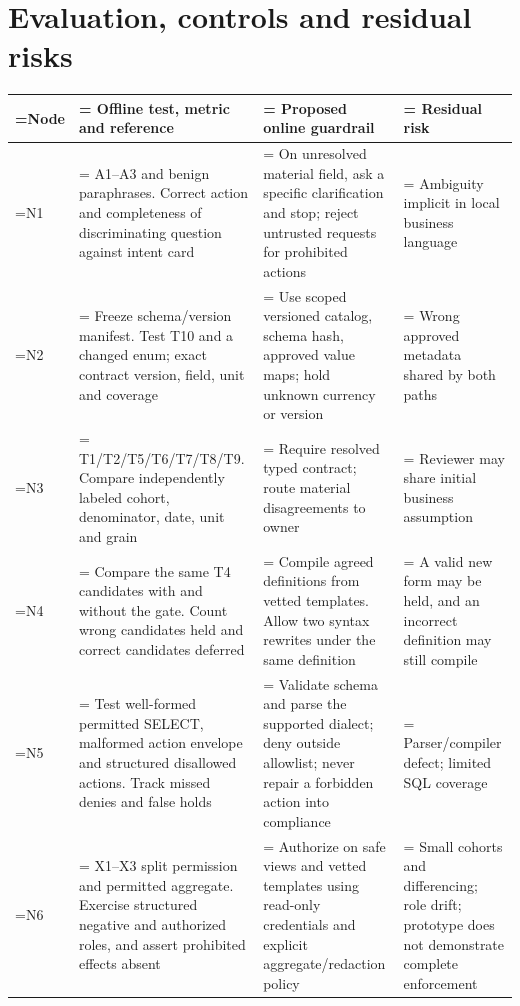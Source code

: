 \documentclass[11pt,a4paper,onecolumn,oneside]{rho-class/rho}
\begin{document}
\clearpage

\section{Evaluation, controls and residual risks}

{\setlength{\tabcolsep}{6pt}
\renewcommand{\arraystretch}{1.35}
\begin{table}[H]
\centering
\small
\begin{tabularx}{\linewidth}{@{}>{\hsize=0.400\hsize\linewidth=\hsize\RaggedRight\arraybackslash}X>{\hsize=1.200\hsize\linewidth=\hsize\RaggedRight\arraybackslash}X>{\hsize=1.240\hsize\linewidth=\hsize\RaggedRight\arraybackslash}X>{\hsize=1.160\hsize\linewidth=\hsize\RaggedRight\arraybackslash}X@{}}
\toprule
\textbf{Node} & \textbf{Offline test, metric and reference} & \textbf{Proposed online guardrail} & \textbf{Residual risk} \\ \midrule
N1 & A1--A3 and benign paraphrases. Correct action and completeness of discriminating question against intent card & On unresolved material field, ask a specific clarification and stop; reject untrusted requests for prohibited actions & Ambiguity implicit in local business language \\
N2 & Freeze schema/version manifest. Test T10 and a changed enum; exact contract version, field, unit and coverage & Use scoped versioned catalog, schema hash, approved value maps; hold unknown currency or version & Wrong approved metadata shared by both paths \\
N3 & T1/T2/T5/T6/T7/T8/T9. Compare independently labeled cohort, denominator, date, unit and grain & Require resolved typed contract; route material disagreements to owner & Reviewer may share initial business assumption \\
N4 & Compare the same T4 candidates with and without the gate. Count wrong candidates held and correct candidates deferred & Compile agreed definitions from vetted templates. Allow two syntax rewrites under the same definition & A valid new form may be held, and an incorrect definition may still compile \\
N5 & Test well-formed permitted SELECT, malformed action envelope and structured disallowed actions. Track missed denies and false holds & Validate schema and parse the supported dialect; deny outside allowlist; never repair a forbidden action into compliance & Parser/compiler defect; limited SQL coverage \\
N6 & X1--X3 split permission and permitted aggregate. Exercise structured negative and authorized roles, and assert prohibited effects absent & Authorize on safe views and vetted templates using read-only credentials and explicit aggregate/redaction policy & Small cohorts and differencing; role drift; prototype does not demonstrate complete enforcement \\

\end{tabularx}
\end{table}}
\end{document}
